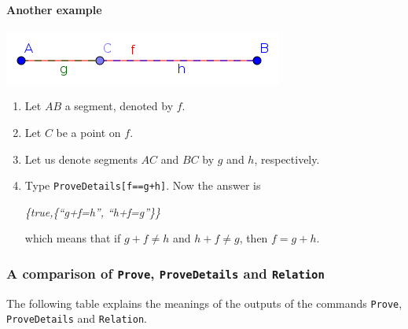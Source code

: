 \documentclass{article}
\begin{document}
\paragraph{Another example}
\begin{center}
\includegraphics[scale=0.5]{ProveDetails-example-2}
\end{center}
\begin{enumerate}
    \item Let $AB$ a segment, denoted by $f$.
    \item Let $C$ be a point on $f$.
    \item Let us denote segments $AC$ and $BC$ by $g$ and $h$, respectively.
    \item Type \texttt{ProveDetails[f==g+h]}. Now the answer is
    \begin{center}
        \textit{\{true,\{``g+f=h'', ``h+f=g''\}\}} 
    \end{center}
    which means that if $g+f\neq h$ and $h+f\neq g$, then $f=g+h$.
\end{enumerate}

\subsubsection{A comparison of \texttt{Prove}, \texttt{ProveDetails} and \texttt{Relation}}
\label{explanation-table}

The following table explains the meanings of the outputs of the commands \texttt{Prove},
\texttt{ProveDetails} and \texttt{Relation}.
\end{document}
